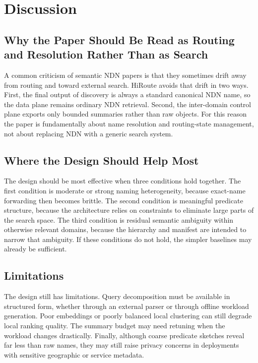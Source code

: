 \documentclass[journal]{IEEEtran}
\newcommand{\sysname}{HiRoute}
\begin{document}
\section{Discussion}

\subsection{Why the Paper Should Be Read as Routing and Resolution Rather Than as Search}

A common criticism of semantic NDN papers is that they sometimes drift away from routing and toward external search. \sysname{} avoids that drift in two ways. First, the final output of discovery is always a standard canonical NDN name, so the data plane remains ordinary NDN retrieval. Second, the inter-domain control plane exports only bounded summaries rather than raw objects. For this reason the paper is fundamentally about name resolution and routing-state management, not about replacing NDN with a generic search system.

\subsection{Where the Design Should Help Most}

The design should be most effective when three conditions hold together. The first condition is moderate or strong naming heterogeneity, because exact-name forwarding then becomes brittle. The second condition is meaningful predicate structure, because the architecture relies on constraints to eliminate large parts of the search space. The third condition is residual semantic ambiguity within otherwise relevant domains, because the hierarchy and manifest are intended to narrow that ambiguity. If these conditions do not hold, the simpler baselines may already be sufficient.

\subsection{Limitations}

The design still has limitations. Query decomposition must be available in structured form, whether through an external parser or through offline workload generation. Poor embeddings or poorly balanced local clustering can still degrade local ranking quality. The summary budget may need retuning when the workload changes drastically. Finally, although coarse predicate sketches reveal far less than raw names, they may still raise privacy concerns in deployments with sensitive geographic or service metadata.
\end{document}
